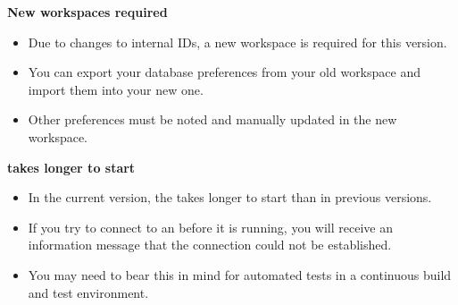 \textbf{New workspaces required}\\
\begin{itemize}
\item Due to changes to internal IDs, a new workspace is required for this version. 
\item You can export your database preferences from your old workspace and import them into your new one. 
\item Other preferences must be noted and manually updated in the new workspace. 
\end{itemize}

\textbf{\gdagent{} takes longer to start}
\begin{itemize}
\item In the current version, the \gdagent{} takes longer to start than in previous versions. 
\item If you try to connect to an \gdagent{} before it is running, you will receive an information message that the connection could not be established.
\item You may need to bear this in mind for automated tests in a continuous build and test environment.
\end{itemize}
